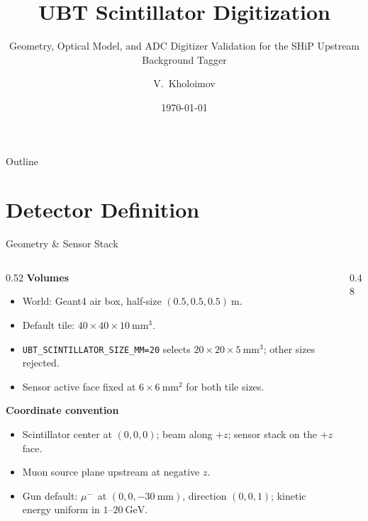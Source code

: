\documentclass[aspectratio=169,10pt]{beamer}
\title[UBT Digitization]{UBT Scintillator Digitization}
\subtitle{Geometry, Optical Model, and ADC Digitizer Validation for the
  SHiP Upstream Background Tagger}
\author{V.~Kholoimov}
\institute[EPFL]{EPFL \\ \textit{SHiP Experiment, CERN}}
\date{\today}
\newcommand{\muminus}{\ensuremath{\mu^{-}}}
\newcommand{\eminus}{\ensuremath{e^{-}}}
\newcommand{\gam}{\ensuremath{\gamma}}
\begin{document}
\begin{frame}
  \titlepage
\end{frame}

\begin{frame}{Outline}
  \tableofcontents
\end{frame}

\section{Detector Definition}

\begin{frame}{Geometry \& Sensor Stack}
  \begin{columns}[T]
    \begin{column}{0.52\textwidth}
      \footnotesize
      \textbf{Volumes}
      \begin{itemize}
        \item World: Geant4 air box, half-size $(0.5,0.5,0.5)~\mathrm{m}$.
        \item Default tile: $40\times40\times10~\mathrm{mm^3}$.
        \item \texttt{UBT\_SCINTILLATOR\_SIZE\_MM=20} selects
          $20\times20\times5~\mathrm{mm^3}$; other sizes rejected.
        \item Sensor active face fixed at $6\times6~\mathrm{mm^2}$ for
          both tile sizes.
      \end{itemize}
      \vspace{3pt}
      \textbf{Coordinate convention}
      \begin{itemize}
        \item Scintillator center at $(0,0,0)$; beam along $+z$; sensor
          stack on the $+z$ face.
        \item Muon source plane upstream at negative $z$.
        \item Gun default: \muminus\ at $(0,0,-30~\mathrm{mm})$, direction
          $(0,0,1)$; kinetic energy uniform in $1$--$20~\mathrm{GeV}$.
      \end{itemize}
    \end{column}
    \begin{column}{0.48\textwidth}
      \centering


\end{column}
\end{columns}
\end{frame}
\end{document}

